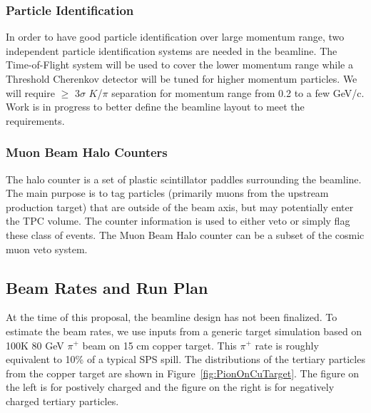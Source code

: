 \subsubsection{Particle Identification}
In order to have good particle identification over large momentum range, two independent particle identification systems are needed in the beamline. The Time-of-Flight system will be used to cover the lower momentum range while a Threshold Cherenkov detector will be tuned for higher momentum particles. We will require $\geq$ 3$\sigma$ $K$/$\pi$ separation for momentum range from 0.2 to a few GeV/c. Work is in progress to better define the beamline layout to meet the requirements.

\subsubsection{Muon Beam Halo Counters}
The halo counter is a set of plastic scintillator paddles surrounding the beamline. The main purpose is to tag particles (primarily muons from the upstream production target) that are outside of the beam axis, but may potentially enter the TPC volume. The counter information is used to either veto or simply flag these class of events. The Muon Beam Halo counter can be a subset of the cosmic muon veto system. 



\subsection{Beam Rates and Run Plan}
At the time of this proposal, the beamline design has not been finalized. To estimate the beam rates, we use inputs from a generic target simulation based on 100K 80 GeV $\pi^+$ beam on 15 cm copper target. This $\pi^+$ rate is roughly equivalent to 10\% of a typical SPS spill. The distributions of the tertiary particles from the copper target are shown in Figure~\ref{fig:PionOnCuTarget}. The figure on the left is for postively charged and the figure on the right is for negatively charged tertiary particles. 

